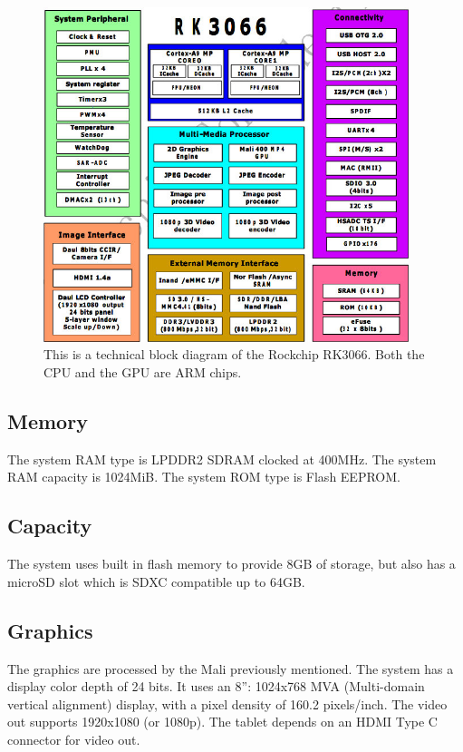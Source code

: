 \documentclass{article}
\begin{document}
\begin{figure}[!htbp]
	\centering
	\includegraphics[width=0.95\textwidth]{rk3066.jpg}
	\caption{This is a technical block diagram of the Rockchip RK3066. Both the CPU and the GPU are ARM chips. }
	\label{rk3066}
\end{figure}

\subsection*{ Memory }
The system RAM type is LPDDR2 SDRAM clocked at 400MHz. The system RAM capacity is 1024MiB. The system ROM type is Flash EEPROM.

\subsection*{ Capacity }
The system uses built in flash memory to provide 8GB of storage, but also has a microSD slot which is SDXC compatible up to 64GB.\cite{Main}

\subsection*{ Graphics }
The graphics are processed by the Mali previously mentioned. The system has a display color depth of 24 bits. It uses an 8'': 1024x768 MVA (Multi\--domain vertical alignment) display, with a pixel density of 160.2 pixels/inch. The video out supports 1920x1080 (or 1080p). The tablet depends on an HDMI Type C connector for video out. 
\end{document}
